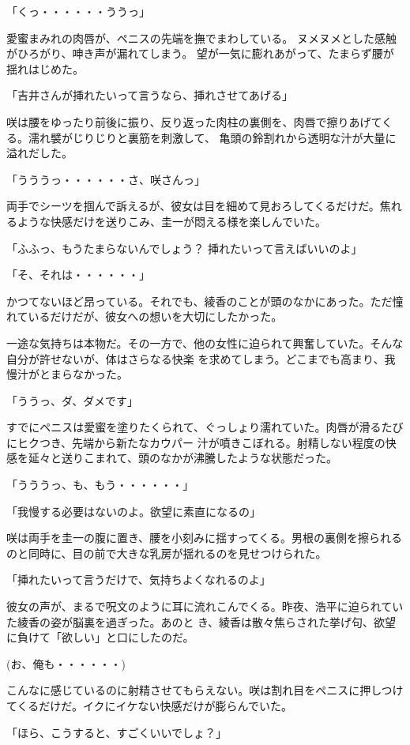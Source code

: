 ﻿\documentclass[book,tate]{jlreq}
\begin{document}
「くっ・・・・・・ううっ」

愛蜜まみれの肉唇が、ペニスの先端を撫でまわしている。 ヌメヌメとした感触がひろがり、呻き声が漏れてしまう。 望が一気に膨れあがって、たまらず腰が揺れはじめた。

「吉井さんが挿れたいって言うなら、挿れさせてあげる」

咲は腰をゆったり前後に振り、反り返った肉柱の裏側を、肉唇で擦りあげてくる。濡れ襞がじりじりと裏筋を刺激して、 亀頭の鈴割れから透明な汁が大量に溢れだした。

「うううっ・・・・・・さ、咲さんっ」

両手でシーツを掴んで訴えるが、彼女は目を細めて見おろしてくるだけだ。焦れるような快感だけを送りこみ、圭一が悶える様を楽しんでいた。

「ふふっ、もうたまらないんでしょう？ 挿れたいって言えばいいのよ」

「そ、それは・・・・・・」

かつてないほど昂っている。それでも、綾香のことが頭のなかにあった。ただ憧れているだけだが、彼女への想いを大切にしたかった。

一途な気持ちは本物だ。その一方で、他の女性に迫られて興奮していた。そんな自分が許せないが、体はさらなる快楽 を求めてしまう。どこまでも高まり、我慢汁がとまらなかった。

「ううっ、ダ、ダメです」

すでにペニスは愛蜜を塗りたくられて、ぐっしょり濡れていた。肉唇が滑るたびにヒクつき、先端から新たなカウパー 汁が噴きこぼれる。射精しない程度の快感を延々と送りこまれて、頭のなかが沸騰したような状態だった。

「うううっ、も、もう・・・・・・」

「我慢する必要はないのよ。欲望に素直になるの」

咲は両手を圭一の腹に置き、腰を小刻みに揺すってくる。男根の裏側を擦られるのと同時に、目の前で大きな乳房が揺れるのを見せつけられた。

「挿れたいって言うだけで、気持ちよくなれるのよ」

彼女の声が、まるで呪文のように耳に流れこんでくる。昨夜、浩平に迫られていた綾香の姿が脳裏を過ぎった。あのと き、綾香は散々焦らされた挙げ句、欲望に負けて「欲しい」と口にしたのだ。

(お、俺も・・・・・・)

こんなに感じているのに射精させてもらえない。咲は割れ目をペニスに押しつけてくるだけだ。イクにイケない快感だけが膨らんでいた。

「ほら、こうすると、すごくいいでしょ？」
\end{document}
